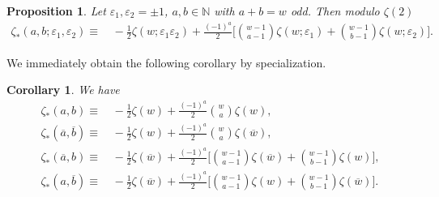 \documentclass{article}
\newcommand\eps{{\varepsilon}}
\newcommand{\N}{\mathbb{N}}
\newcommand{\ol}{\overline}
\theoremstyle{plain}
\newtheorem{cor}[thm]{Corollary}
\newtheorem{prop}[thm]{Proposition}
\theoremstyle{definition}
\begin{document}
\begin{prop}\label{prop:DBESreduce}
Let $\eps_1,\eps_2=\pm1$, $a,b\in\N$ with $a+b=w$ odd. Then modulo $\zeta(2)$
\begin{align*}
\zeta_\ast(a,b;\eps_1,\eps_2)\equiv &\, -\frac12\zeta(w;\eps_1\eps_2)+\frac{(-1)^a}2\bigg[\binom{w-1}{a-1}\zeta(w;\eps_1)+\binom{w-1}{b-1}\zeta(w;\eps_2)\bigg].
\end{align*}
\end{prop}

We immediately obtain the following corollary by specialization.
\begin{cor}\label{cor:DBESreduce}
We have
\begin{align*}
\zeta_\ast(a,b)\equiv&\, -\frac12\zeta(w)+\frac{(-1)^a}{2}\binom{w}{a} \zeta(w),\\
\zeta_\ast(\ol{a},\ol{b})\equiv &\, -\frac12\zeta(w)+\frac{(-1)^a}2\binom{w}{a}\zeta(\ol{w}),\\
\zeta_\ast(\ol{a},b)\equiv &\, -\frac12\zeta(\ol{w})+\frac{(-1)^a}2\bigg[\binom{w-1}{a-1}\zeta(\ol{w})+\binom{w-1}{b-1}\zeta(w)\bigg],\\
\zeta_\ast(a,\ol{b})\equiv &\,-\frac12\zeta(\ol{w})+\frac{(-1)^a}2\bigg[\binom{w-1}{a-1}\zeta(w)+\binom{w-1}{b-1}\zeta(\ol{w})\bigg].
\end{align*}
\end{cor}
\end{document}
